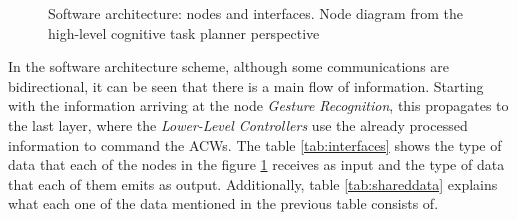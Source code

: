 \begin{figure}[ht]
{}
	\caption{Software architecture: nodes and interfaces. Node diagram from the high-level cognitive task planner perspective}
	\label{fig:NodeDiagram}
\end{figure}

In the software architecture scheme, although some communications are bidirectional, it can be seen that there is a main flow of information. Starting with the information arriving at the node \emph{Gesture Recognition}, this propagates to the last layer, where the \emph{Lower-Level Controllers} use the already processed information to command the \glspl{ACW}. The table \ref{tab:interfaces} shows the type of data that each of the nodes in the figure \ref{fig:NodeDiagram} receives as input and the type of data that each of them emits as output. Additionally, table \ref{tab:shareddata} explains what each one of the data mentioned in the previous table consists of.

